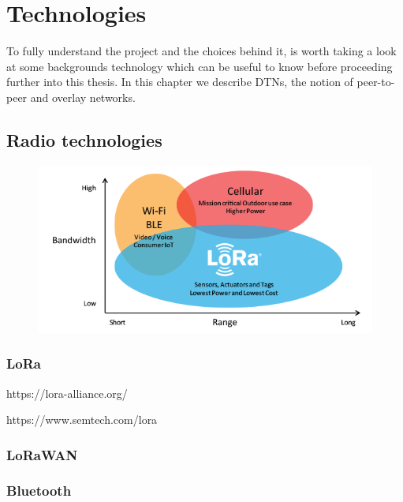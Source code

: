 
\chapter{Technologies}\label{chapter:technologies}

	To fully understand the project and the choices behind it, is worth taking a look at some backgrounds technology which can be useful to know before proceeding further into this thesis.
	In this chapter we describe DTNs, the notion of peer-to-peer and overlay networks.

	

	\section{Radio technologies}\label{sec:section_two}
	
		\begin{figure}
			\centering
			\includegraphics[width=\textwidth]{resources/img/LoRa_Why_Range}
			\caption{}
		\end{figure}
	
		\subsection{LoRa}
		
		https://lora-alliance.org/
		
		https://www.semtech.com/lora
		
		\subsection{LoRaWAN}
		
		\subsection{Bluetooth}		
		
